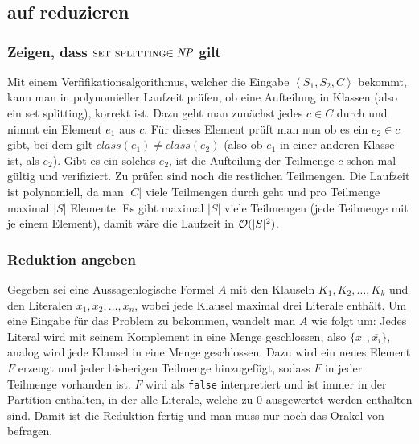 \documentclass[a4paper]{article}
\begin{document}
	\section{}
		\subsection{\threesat auf \setsplit reduzieren}
			\subsubsection{Zeigen, dass $\setsplit\in\np$ gilt}
			Mit einem Verfifikationsalgorithmus, welcher die Eingabe $\left\langle S_1, S_2, C \right\rangle$ bekommt, kann man in polynomieller Laufzeit prüfen, ob eine Aufteilung in Klassen (also ein set splitting), korrekt ist.\n
			Dazu geht man zunächst jedes $c\in C$ durch und nimmt ein Element $e_1$ aus $c$.
			Für dieses Element prüft man nun ob es ein $e_2\in c$ gibt, bei dem gilt $class(e_1)\neq class(e_2)$ (also ob $e_1$ in einer anderen Klasse ist, als $e_2$).
			Gibt es ein solches $e_2$, ist die Aufteilung der Teilmenge $c$ schon mal gültig und verifiziert.
			Zu prüfen sind noch die restlichen Teilmengen.\n
			Die Laufzeit ist polynomiell, da man $|C|$ viele Teilmengen durch geht und pro Teilmenge maximal $|S|$ Elemente. Es gibt maximal $|S|$ viele Teilmengen (jede Teilmenge mit je einem Element), damit wäre die Laufzeit in $\mathcal{O}(|S|^2)$.
			\subsubsection{Reduktion angeben}
			Gegeben sei eine Aussagenlogische Formel $A$ mit den Klauseln $K_1, K_2, \dots, K_k$ und den Literalen $x_1, x_2, \dots, x_n$, wobei jede Klausel maximal drei Literale enthält.
			Um eine Eingabe für das \setsplit Problem zu bekommen, wandelt man $A$ wie folgt um:\n
			Jedes Literal wird mit seinem Komplement in eine Menge geschlossen, also $\{x_1, \overline{x_i}\}$, analog wird jede Klausel in eine Menge geschlossen.
			Dazu wird ein neues Element $F$ erzeugt und jeder bisherigen Teilmenge hinzugefügt, sodass $F$ in jeder Teilmenge vorhanden ist. $F$ wird als \texttt{false} interpretiert und ist immer in der Partition enthalten, in der alle Literale, welche zu 0 ausgewertet werden enthalten sind.\n
			Damit ist die Reduktion fertig und man muss nur noch das Orakel von \setsplit befragen.
\end{document}
